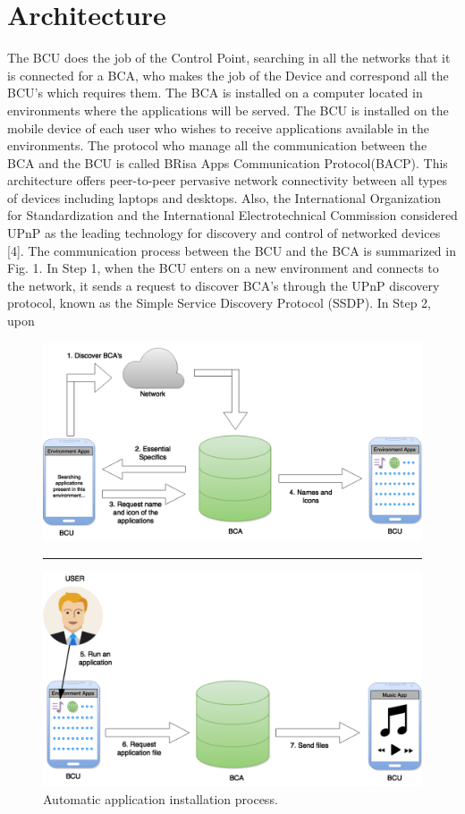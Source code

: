\documentclass[journal]{IEEEtran}
\begin{document}
\section{Architecture}
The BCU does the job of the Control Point, searching in all the networks that it is connected for a BCA, who makes the job of the Device and correspond all the BCU's which requires them.  The BCA is installed on a computer located in environments where the applications will be served. The BCU is installed on the mobile device of each user who wishes to receive applications available in the environments.
    The protocol who manage all the communication between the BCA and the BCU is called BRisa Apps Communication Protocol(BACP). This architecture offers peer-to-peer pervasive network connectivity between all types of devices including laptops and desktops. Also, the International Organization for Standardization and the International Electrotechnical Commission considered UPnP as the leading technology for discovery and control of networked devices [4].
The communication process between the BCU and the BCA is summarized in Fig. 1. In Step 1, when the BCU enters on a new environment and connects to the network, it sends a request to discover BCA’s through the UPnP discovery protocol, known as the Simple Service Discovery Protocol (SSDP). In Step 2, upon

\begin{figure}[tb]
    \includegraphics[scale = 0.26]{FIG1}    
    \rule[1ex]{10cm}{0.5pt}
\end{figure}

\begin{figure}[tb]
    \includegraphics[scale = 0.26]{FIG2}
    \caption{Automatic application installation process.}
\end{figure}
\end{document}
